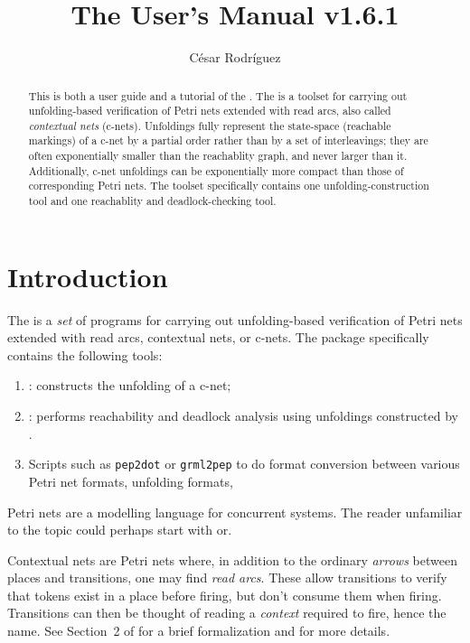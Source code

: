 \documentclass[a4paper]{refart}
\title{The \cunft{} User's Manual \hfill v1.6.1}
\author{C\'esar Rodr\'iguez}
\begin{document}
\maketitle

\begin{abstract}
This is both a user guide and a tutorial of the \cunft{}.
The \cunft{} is a toolset for carrying out unfolding-based
verification of Petri nets extended with read arcs, also called
\emph{contextual nets} (c-nets).
Unfoldings fully represent the state-space (reachable markings) of a c-net
by a partial order rather than by a set of interleavings;
they are often exponentially smaller than the reachablity graph, and never
larger than it.
Additionally, c-net unfoldings can be exponentially more compact than
those of corresponding Petri nets.
The toolset specifically contains one unfolding-construction
tool and one reachablity and deadlock-checking tool.
\end{abstract}

\tableofcontents

\section{Introduction}%
\label{s:intro}

The \emph{\cunft{}} is a \emph{set}
of programs for carrying out unfolding-based
verification of Petri nets extended with read arcs, \aka contextual
nets, or c-nets.  The package specifically contains the following tools:
\begin{enumerate}
\item
  \cunf: constructs the unfolding of a c-net;
\item
  \cna: performs reachability and deadlock analysis using unfoldings
  constructed by \cunf.
\item
  Scripts such as \verb!pep2dot! or \verb!grml2pep! to do format conversion
  between various Petri net formats, unfolding formats, \etc
\end{enumerate}

Petri nets are a modelling language for concurrent systems.
The reader unfamiliar to the topic could perhaps start with\cite{wiki:pn}
or\cite{Mur89}.

Contextual nets are Petri nets where, in addition to the ordinary
\textit{arrows} between places and transitions, one may find
\emph{read arcs}.
These allow transitions to verify that
tokens exist in a place before firing, but don't consume them
when firing.
Transitions can then be thought of reading a
\emph{context} required to fire, hence the name.
See Section~2 of\cite{BBCKRS12} for a brief formalization
and\cite{MR95} for more details.
\end{document}
